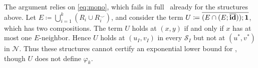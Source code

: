 \smallskip
{}
The argument relies on \eqref{eq:mono}, which fails in full \CoR\ already for the structures above.
Let $E\coloneqq\bigcup_{i=1}^k(R_i\cup R_i^\smile)$, and consider the term
$U\coloneqq\overline{(E\cap(E;\overline{\mathbf{id}}));\mathbf{1}}$, which has two compositions. The term $U$ holds at $(x,y)$ if and only if
$x$ has at most one $E$-neighbor. Hence $U$ holds at $(u_I,v_I)$ in every
$\mathcal S_I$ but not at $(u^*,v^*)$ in $\mathcal N$.
Thus these structures cannot certify an exponential lower bound for
\CoR, though $U$ does not define $\varphi_k$.
